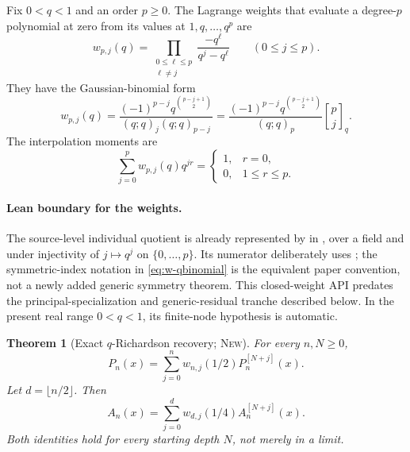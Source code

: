 \documentclass[11pt,oneside]{article}
\theoremstyle{frontier}
\newtheorem{theorem}{Theorem}[section]
\theoremstyle{definition}
\theoremstyle{remark}
\newcommand{\qbinom}[3]{\genfrac{[}{]}{0pt}{}{#1}{#2}_{#3}}
\newcommand{\statusnew}{\textsc{New}}
\begin{document}
Fix $0<q<1$ and an order $p\ge0$.  The Lagrange weights that evaluate a degree-$p$ polynomial at
zero from its values at $1,q,\ldots,q^p$ are
\begin{equation}
 w_{p,j}(q)
 =\prod_{\substack{0\le\ell\le p\\\ell\ne j}}
 \frac{-q^\ell}{q^j-q^\ell}
 \qquad(0\le j\le p).
 \label{eq:w-Lagrange}
\end{equation}
They have the Gaussian-binomial form
\begin{equation}
 \boxed{
 w_{p,j}(q)
 =\frac{(-1)^{p-j}q^{\binom{p-j+1}{2}}}
 {(q;q)_j(q;q)_{p-j}}
 =\frac{(-1)^{p-j}q^{\binom{p-j+1}{2}}}{(q;q)_p}
 \qbinom pj q.
 }
 \label{eq:w-qbinomial}
\end{equation}
The interpolation moments are
\begin{equation}
 \sum_{j=0}^{p}w_{p,j}(q)q^{jr}
 =\begin{cases}
 1,&r=0,\\
 0,&1\le r\le p.
 \end{cases}
 \label{eq:w-annihilation}
\end{equation}

\paragraph{Lean boundary for the weights.}
The source-level individual quotient is already represented by
 in
, over a field and under injectivity of
\(j\mapsto q^j\) on \(\{0,\ldots,p\}\).  Its numerator deliberately uses
; the symmetric-index notation in
\eqref{eq:w-qbinomial} is the equivalent paper convention, not a newly added
generic symmetry theorem.  This closed-weight API predates the
principal-specialization and generic-residual tranche described below.  In the
present real range \(0<q<1\), its finite-node hypothesis is automatic.

\begin{theorem}[Exact $q$-Richardson recovery; \statusnew]
\label{thm:exact-recovery}
For every $n,N\ge0$,
\begin{equation}
 \boxed{
 P_n(x)=\sum_{j=0}^{n}w_{n,j}(1/2)P_n^{[N+j]}(x).
 }
 \label{eq:P-exact-recovery}
\end{equation}
Let $d=\lfloor n/2\rfloor$.  Then
\begin{equation}
 \boxed{
 A_n(x)=\sum_{j=0}^{d}w_{d,j}(1/4)A_n^{[N+j]}(x).
 }
 \label{eq:A-exact-recovery}
\end{equation}
Both identities hold for every starting depth $N$, not merely in a limit.
\end{theorem}
\end{document}
